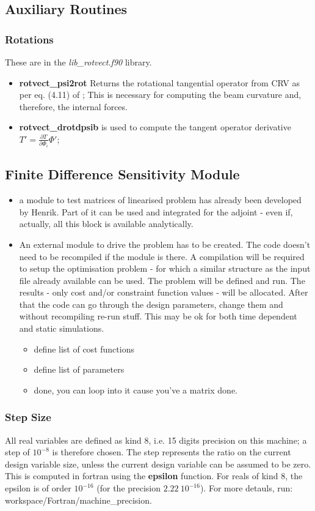 \documentclass[a4paper,10pt]{article}
\newcommand{\bit}{\begin{itemize}}
\newcommand{\eit}{\end{itemize}}
\newcommand{\pder}[2]{\frac{\partial{#1}}{\partial{#2}}}	%
\newcommand{\ffile}[1]{\textsl{{#1}.f90}} %
\newcommand{\ffun}[1]{\textbf{{#1}}}  %
\begin{document}
\subsection{Auxiliary Routines}

\subsubsection{Rotations}
These are in the \ffile{lib\_rotvect} library.
\bit
\item \ffun{rotvect\_psi2rot} Returns the rotational tangential operator from CRV as per eq. (4.11) of \cite{Geradin2001}; This is necessary for computing the beam curvature and, therefore, the internal forces.
\item \ffun{rotvect\_drotdpsib} is used to compute the tangent operator derivative $T' = \pder{T}{\Phi_i}{\Phi'}$;
\eit




\subsection{Finite Difference Sensitivity Module}
\bit
\item a module to test matrices of linearised problem has already been developed by Henrik. Part of it can be used and integrated for the adjoint - even if, actually, all this block is available analytically.
\item An external module to drive the problem has to be created. The code doesn't need to be recompiled if the module is there. A compilation will be required to setup the optimisation problem - for which a similar structure as the input file already available can be used. The problem will be defined and run. The results - only cost and/or constraint function values - will be allocated. After that the code can go through the design parameters, change them and without recompiling re-run stuff. This may be ok for both time dependent and static simulations.
	\bit
	\item define list of cost functions
	\item define list of parameters
	\item done, you can loop into it cause you've a matrix done.
	\eit
\eit

\subsubsection{Step Size}
All real variables are defined as kind 8,  i.e. 15 digits precision on this machine; a step of $10^{-8}$ is therefore chosen. The step represents the ratio on the current design variable size, unless the current design variable can be assumed to be zero. This is computed in fortran using the \ffun{epsilon} function. For reals of kind 8, the epsilon is of order $10^{-16}$ (for the precision $2.22 \ 10^{-16}
$). For more detauls, run: workspace/Fortran/machine\_precision.
\end{document}
